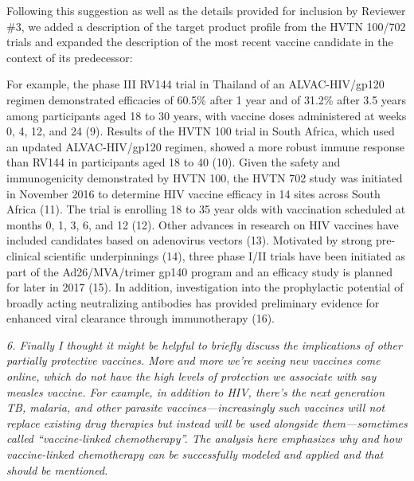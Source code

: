 \documentclass[12pt]{jpmletter}
\newenvironment{original}{\it}{}
\begin{document}
\begin{letter}{}
    Following this suggestion as well as the details provided for
    inclusion by Reviewer \#3, we added a description of the target
    product profile from the HVTN 100/702 trials and expanded the
    description of the most recent vaccine candidate in the context of
    its predecessor:
    \begin{quoting}
      For example, the phase III RV144 trial in Thailand of an
      ALVAC-HIV/gp120 regimen demonstrated efficacies of 60.5\% after
      1 year and of 31.2\% after 3.5 years among participants aged 18
      to 30 years, with vaccine doses administered at weeks 0, 4, 12,
      and 24 (9). Results of the HVTN 100 trial in South Africa,
      which used an updated ALVAC-HIV/gp120 regimen, showed a more
      robust immune response than RV144 in participants aged 18 to 40
      (10).  Given the safety and immunogenicity demonstrated by HVTN
      100, the HVTN 702 study was initiated in November 2016 to
      determine HIV vaccine efficacy in 14 sites across South Africa
      (11). The trial is enrolling 18 to 35 year olds with vaccination
      scheduled at months 0, 1, 3, 6, and 12 (12).  Other advances in
      research on HIV vaccines have included candidates based on
      adenovirus vectors (13).  Motivated by strong pre-clinical
      scientific underpinnings (14), three phase I/II trials have been
      initiated as part of the Ad26/MVA/trimer gp140 program and an
      efficacy study is planned for later in 2017 (15).  In addition,
      investigation into the prophylactic potential of broadly acting
      neutralizing antibodies has provided preliminary evidence for
      enhanced viral clearance through immunotherapy (16).
    \end{quoting}

    \begin{original}
      6. Finally I thought it might be helpful to briefly discuss the
      implications of other partially protective vaccines. More and
      more we're seeing new vaccines come online, which do not have
      the high levels of protection we associate with say measles
      vaccine. For example, in addition to HIV, there's the next
      generation TB, malaria, and other parasite vaccines—increasingly
      such vaccines will not replace existing drug therapies but
      instead will be used alongside them—sometimes called
      ``vaccine-linked chemotherapy''. The analysis here emphasizes
      why and how vaccine-linked chemotherapy can be successfully
      modeled and applied and that should be mentioned.
    \end{original}


\end{letter}
\end{document}

